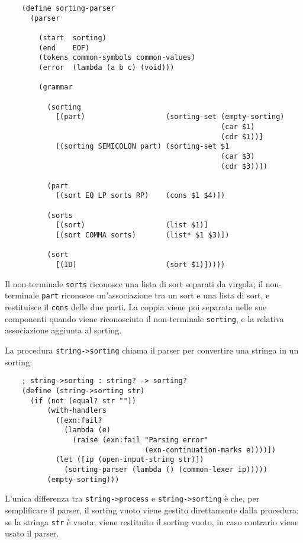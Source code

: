 \begin{lstlisting}
    (define sorting-parser
      (parser

        (start  sorting)
        (end    EOF)
        (tokens common-symbols common-values)
        (error  (lambda (a b c) (void)))

        (grammar

          (sorting
            [(part)                   (sorting-set (empty-sorting)
                                                   (car $1)
                                                   (cdr $1))]
            [(sorting SEMICOLON part) (sorting-set $1
                                                   (car $3)
                                                   (cdr $3))])

          (part
            [(sort EQ LP sorts RP)    (cons $1 $4)])

          (sorts
            [(sort)                   (list $1)]
            [(sort COMMA sorts)       (list* $1 $3)])

          (sort
            [(ID)                     (sort $1)]))))
\end{lstlisting}

Il non-terminale \lstinline{sorts} riconosce una lista di sort separati
da virgola; il non-terminale \lstinline{part} riconosce un'associazione
tra un sort e una lista di sort, e restituisce il \lstinline{cons} delle
due parti. La coppia viene poi separata nelle sue componenti quando
viene riconosciuto il non-terminale \lstinline{sorting}, e la relativa
associazione aggiunta al sorting.

La procedura \lstinline{string->sorting} chiama il parser per convertire
una stringa in un sorting:

\begin{lstlisting}
    ; string->sorting : string? -> sorting?
    (define (string->sorting str)
      (if (not (equal? str ""))
          (with-handlers
            ([exn:fail?
              (lambda (e)
                (raise (exn:fail "Parsing error"
                                 (exn-continuation-marks e))))])
            (let ([ip (open-input-string str)])
              (sorting-parser (lambda () (common-lexer ip)))))
          (empty-sorting)))
\end{lstlisting}

L'unica differenza tra \lstinline{string->process} e
\lstinline{string->sorting} \`e che, per semplificare il parser, il
sorting vuoto viene gestito direttamente dalla procedura: se la
stringa \lstinline{str} \`e vuota, viene restituito il sorting vuoto,
in caso contrario viene usato il parser.
